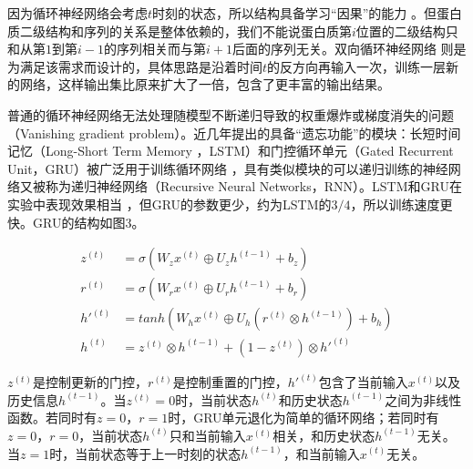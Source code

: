 \documentclass[a4paper, tikz]{article}
\begin{document}
因为循环神经网络会考虑$t$时刻的状态，所以结构具备学习“因果”的能力\citep{mikolov2010recurrent} 。但蛋白质二级结构和序列的关系是整体依赖的，我们不能说蛋白质第$i$位置的二级结构只和从第$1$到第$i-1$的序列相关而与第$i+1$后面的序列无关。双向循环神经网络\citep{petridis2018end} 则是为满足该需求而设计的，具体思路是沿着时间$t$的反方向再输入一次，训练一层新的网络，这样输出集比原来扩大了一倍，包含了更丰富的输出结果。

普通的循环神经网络无法处理随模型不断递归导致的权重爆炸或梯度消失的问题（Vanishing gradient problem）。近几年提出的具备“遗忘功能”的模块：长短时间记忆（Long-Short Term Memory ，LSTM）和门控循环单元（Gated Recurrent Unit，GRU）被广泛用于训练循环网络\citep{chung2014empirical}\citep{gers1999learning} ，具有类似模块的可以递归训练的神经网络又被称为递归神经网络（Recursive Neural Networks，RNN）。LSTM和GRU在实验中表现效果相当\citep{goodfellow2016deep} ，但GRU的参数更少，约为LSTM的$3/4$，所以训练速度更快。GRU的结构如图$3$。

\begin{align}
z^{(t)} &= \sigma(W_z x^{(t)}\oplus  U_z h^{(t-1)}+b_z)\\
r^{(t)} &= \sigma(W_r x^{(t)}\oplus U_r h^{(t-1)}+b_r)\\
h'^{(t)}&= tanh(W_h x^{(t)}\oplus U_h(r^{(t)}\otimes h^{(t-1)})+b_h)\\
h^{(t)} &= z^{(t)}\otimes h^{(t-1)}+(1-z^{(t)})\otimes h'^{(t)}
\end{align}

$z^{(t)}$是控制更新的门控，$r^{(t)}$是控制重置的门控，$h'^{(t)}$包含了当前输入$x^{(t)}$以及历史信息$h^{(t-1)}$。当$z^{(t)}=0$时，当前状态$h^{(t)}$和历史状态$h^{(t-1)}$之间为非线性函数。若同时有$z=0$，$r=1$时，GRU单元退化为简单的循环网络；若同时有$z=0$，$r=0$，当前状态$h^{(t)}$只和当前输入$x^{(t)}$相关，和历史状态$h^{(t-1)}$无关。当$z=1$时，当前状态等于上一时刻的状态$h^{(t-1)}$，和当前输入$x^{(t)}$无关。
\end{document}
